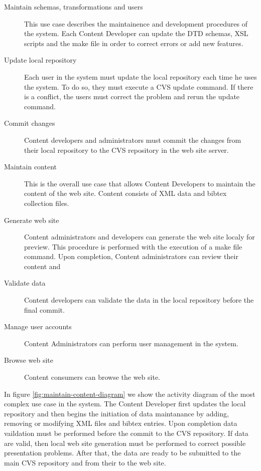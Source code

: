 \documentclass[10pt]{article}
\begin{document}
\begin{description}
\item[Maintain schemas, transformations and users] This use case describes the maintainence and development
 procedures of the system. Each Content Developer can update the DTD schemas, XSL scripts and the make file 
 in order to correct errors or add new features.

\item[Update local repository] Each user in the system must update the local repository each time he uses the system. 
To do so, they must execute a CVS update command. If there is a conflict, the users must correct the problem and rerun the
update command.

\item[Commit changes] Content developers and administrators must commit the changes from their local repository 
to the CVS repository in the web site server.

\item[Maintain content] This is the overall use case that allows Content Developers to maintain the content of the web site. 
Content consists of XML data and bibtex collection files.

\item[Generate web site] Content administrators and developers can generate the web site localy for preview. This procedure is 
performed with the execution of a make file command. Upon completion, Content administrators can review their content and   

\item[Validate data] Content developers can validate the data in the local repository before the final commit.

\item[Manage user accounts] Content Administrators can perform user management in the system. 

\item[Browse web site] Content consumers can browse the web site.

\end{description} 

In figure \ref{fig:maintain-content-diagram} we show the activity diagram of the most complex use case in the system. The Content Developer first updates the local repository and then begins the initiation of data maintanance by adding, removing or modifying XML files and bibtex entries. Upon completion data vaildation must be performed before the commit to the CVS repository. If data are valid, then local web site generation must be performed to correct possible presentation problems. After that, the data are ready to be submitted to the main CVS repository and from their to the web site.
\end{document}
